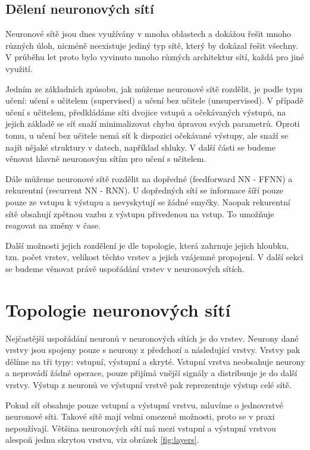 \subsection{Dělení neuronových sítí}

Neuronové sítě jsou dnes využívány v mnoha oblastech a dokážou řešit mnoho
různých úloh, nicméně neexistuje jediný typ sítě, který by dokázal řešit
všechny. V průběhu let proto bylo vyvinuto mnoho různých architektur sítí,
každá pro jiné využití.

Jedním ze základních způsobu, jak můžeme neuronové sítě rozdělit, je podle typu
učení: učení s učitelem (supervised) a učení bez učitele (unsupervised). V
případě učení s učitelem, předkládáme síti dvojice vstupů a očekávaných
výstupů, na jejich základě se síť snaží minimalizovat chybu úpravou svých
parametrů. Oproti tomu, u učení bez učitele nemá síť k dispozici očekávané
výstupy, ale snaží se najít nějaké struktury v datech, například shluky. V
další části se budeme věnovat hlavně neuronovým sítím pro učení s učitelem.

Dále můžeme neuronové sítě rozdělit na dopředné (feedforward NN - FFNN) a
rekurentní (recurrent NN - RNN). U dopředných sítí se informace šíří pouze
pouze ze vstupu k výstupu a nevyskytují se žádné smyčky. Naopak rekurentní sítě
obsahují zpětnou vazbu z výstupu přivedenou na vstup. To umožňuje reagovat na
změny v čase.

Další možnosti jejich rozdělení je dle topologie, která zahrnuje jejich
hloubku, tzn. počet vrstev, velikost těchto vrstev a jejich vzájemné propojení.
V další sekci se budeme věnovat právě uspořádání vrstev v neuronových sítích.

\section{Topologie neuronových sítí}
Nejčastější uspořádání neuronů v neuronových sítích je do vrstev. Neurony dané
vrstvy jsou spojeny pouze s neurony z předchozí a následující vrstvy. Vrstvy
pak dělíme na tři typy: vstupní, výstupní a skryté. Vstupní vrstva neobsahuje
neurony a neprovádí žádné operace, pouze přijímá vnější signály a distribuuje
je do další vrstvy. Výstup z neuronů ve výstupní vrstvě pak reprezentuje výstup
celé sítě. 

Pokud síť obsahuje pouze vstupní a výstupní vrstvu, mluvíme o jednovrstvé
neuronové síti. Takové sítě mají velmi omezené možnosti, proto se v praxi
nepoužívají. Většina neuronových sítí má mezi vstupní a výstupní vrstvou
alespoň jednu skrytou vrstvu, viz obrázek \ref{fig:layers}.

